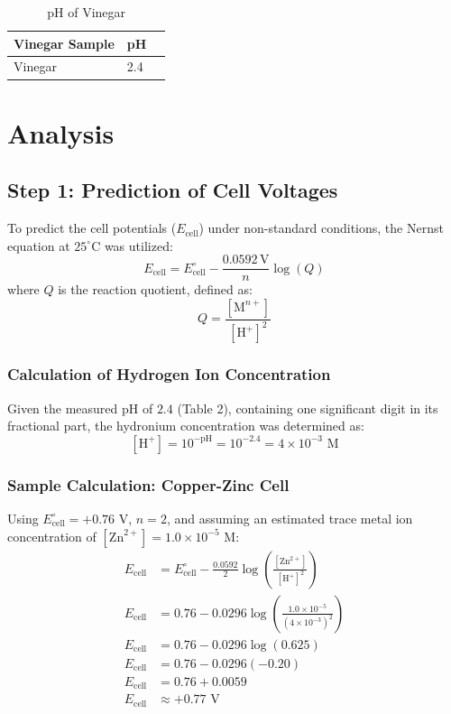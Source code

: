 \documentclass[11pt]{article}
\begin{document}
\vspace{0.5cm}
\noindent
\begin{table}[ht]
  \caption{pH of Vinegar}
\begin{tabular}{p{4cm} p{3.5cm} p{5cm}}
\toprule
Vinegar Sample & pH \\
\midrule
Vinegar & 2.4 \\
\bottomrule
\end{tabular}
\newpage
\end{table}

\section*{Analysis}

\subsection*{Step 1: Prediction of Cell Voltages}
To predict the cell potentials ($E_{\text{cell}}$) under non-standard conditions, the Nernst equation at $25^\circ\text{C}$ was utilized:
\[ E_{\text{cell}} = E^\circ_{\text{cell}} - \frac{0.0592\,\text{V}}{n}\log\left(Q\right) \]
where $Q$ is the reaction quotient, defined as:
\[ Q = \frac{[\text{M}^{n+}]}{[\text{H}^+]^2} \]

\subsubsection*{Calculation of Hydrogen Ion Concentration}
Given the measured pH of $2.4$ (Table 2), containing one significant digit in its fractional part, the hydronium concentration was determined as:
\[ [\text{H}^+] = 10^{-\text{pH}} = 10^{-2.4} = 4 \times 10^{-3}\text{ M} \]

\subsubsection*{Sample Calculation: Copper-Zinc Cell}
Using $E^\circ_{\text{cell}} = +0.76\text{ V}$, $n = 2$, and assuming an estimated trace metal ion concentration of $[\text{Zn}^{2+}] = 1.0 \times 10^{-5}\text{ M}$:
\begin{align*}
    E_{\text{cell}} &= E^\circ_{\text{cell}} - \frac{0.0592}{2}\log\left(\frac{[\text{Zn}^{2+}]}{[\text{H}^+]^2}\right) \\
    E_{\text{cell}} &= 0.76 - 0.0296\log\left(\frac{1.0 \times 10^{-5}}{(4 \times 10^{-3})^2}\right) \\
    E_{\text{cell}} &= 0.76 - 0.0296\log(0.625) \\
    E_{\text{cell}} &= 0.76 - 0.0296(-0.20) \\
    E_{\text{cell}} &= 0.76 + 0.0059 \\
    E_{\text{cell}} &\approx +0.77\text{ V}
\end{align*}
\end{document}
